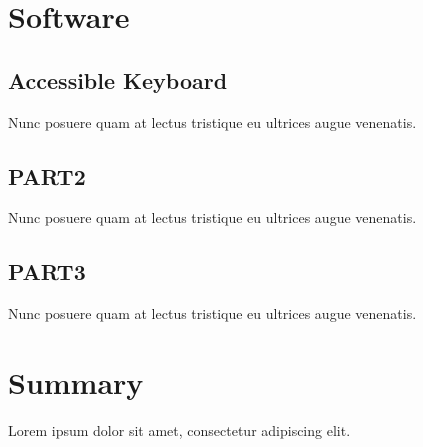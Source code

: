 
\section{Software}


\subsection{Accessible Keyboard}

Nunc posuere quam at lectus tristique eu ultrices augue venenatis.

\subsection{PART2}

Nunc posuere quam at lectus tristique eu ultrices augue venenatis.

\subsection{PART3}

Nunc posuere quam at lectus tristique eu ultrices augue venenatis.


\section{Summary}

Lorem ipsum dolor sit amet, consectetur adipiscing elit.
